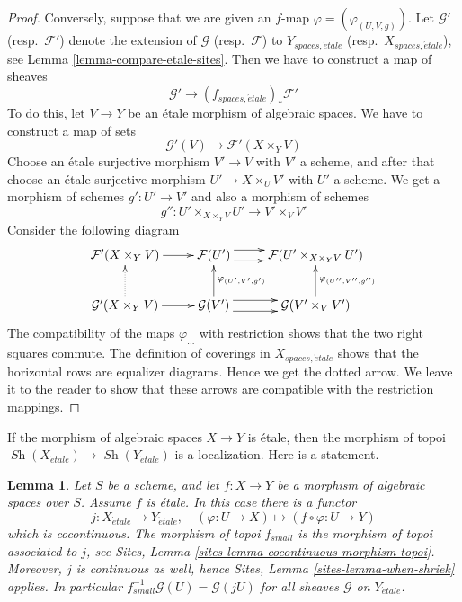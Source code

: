 \documentclass{stacks-project}
\theoremstyle{plain}
\newtheorem{lemma}[subsection]{Lemma}
\theoremstyle{definition}
\theoremstyle{remark}
\numberwithin{equation}{subsection}
\def\Sh{\mathop{\mathit{Sh}}\nolimits}
\def\etale{{\acute{e}tale}}
\begin{document}
\begin{proof}
\medskip\noindent
Conversely, suppose that we are given an $f$-map
$\varphi = (\varphi_{(U, V, g)})$.
Let $\mathcal{G}'$ (resp.\ $\mathcal{F}'$) denote the extension of
$\mathcal{G}$ (resp.\ $\mathcal{F}$) to $Y_{spaces, \etale}$
(resp.\ $X_{spaces, \etale}$), see
Lemma \ref{lemma-compare-etale-sites}.
Then we have to construct a map of sheaves
$$
\mathcal{G}' \longrightarrow (f_{spaces, \etale})_*\mathcal{F}'
$$
To do this, let $V \to Y$ be an \'etale morphism of algebraic spaces.
We have to construct a map of sets
$$
\mathcal{G}'(V) \to \mathcal{F}'(X \times_Y V)
$$
Choose an \'etale surjective morphism $V' \to V$ with $V'$ a scheme,
and after that choose an \'etale surjective morphism
$U' \to X \times_U V'$ with $U'$ a scheme. We get a morphism of
schemes $g' : U' \to V'$ and also a morphism of schemes
$$
g'' : U' \times_{X \times_Y V} U' \longrightarrow V' \times_V V'
$$
Consider the following diagram
$$
\xymatrix{
\mathcal{F}'(X \times_Y V) \ar[r] &
\mathcal{F}(U') \ar@<1ex>[r] \ar@<-1ex>[r] &
\mathcal{F}(U' \times_{X \times_Y V} U') \\
\mathcal{G}'(X \times_Y V) \ar[r] \ar@{..>}[u] &
\mathcal{G}(V') \ar@<1ex>[r] \ar@<-1ex>[r] \ar[u]_{\varphi_{(U', V', g')}} &
\mathcal{G}(V' \times_V V') \ar[u]_{\varphi_{(U'', V'', g'')}}
}
$$
The compatibility of the maps $\varphi_{...}$
with restriction shows that the two right squares commute.
The definition of coverings in $X_{spaces, \etale}$ shows that
the horizontal rows are equalizer diagrams. Hence we get
the dotted arrow. We leave it to the reader to show that these
arrows are compatible with the restriction mappings.
\end{proof}

\noindent
If the morphism of algebraic spaces $X \to Y$ is \'etale, then the morphism
of topoi $\Sh(X_\etale) \to \Sh(Y_\etale)$
is a localization. Here is a statement.

\begin{lemma}
\label{lemma-etale-morphism-topoi}
Let $S$ be a scheme, and let $f : X \to Y$ be a morphism of algebraic spaces
over $S$. Assume $f$ is \'etale. In this case there is a functor
$$
j : X_\etale \to Y_\etale, \quad
(\varphi : U \to X) \mapsto (f \circ \varphi : U \to Y)
$$
which is cocontinuous. The morphism of topoi $f_{small}$ is the
morphism of topoi associated to $j$, see
Sites, Lemma \ref{sites-lemma-cocontinuous-morphism-topoi}.
Moreover, $j$ is continuous as well, hence
Sites, Lemma \ref{sites-lemma-when-shriek}
applies. In particular $f_{small}^{-1}\mathcal{G}(U) = \mathcal{G}(jU)$
for all sheaves $\mathcal{G}$ on $Y_\etale$.
\end{lemma}
\end{document}
